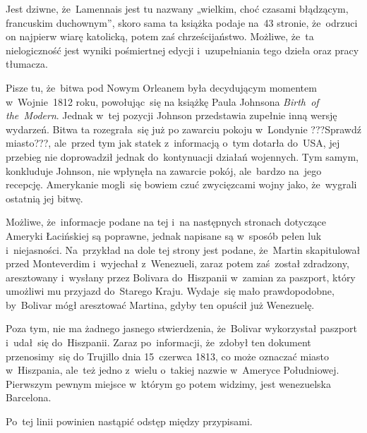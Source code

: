 \documentclass[a4paper,11pt]{article}
\numberwithin{equation}{section}
\begin{document}
\noindent
{} Jest dziwne, że~Lamennais jest tu nazwany „wielkim, choć czasami
błądzącym, francuskim duchownym”, skoro sama ta książka podaje na~43
stronie, że~odrzuci on najpierw wiarę katolicką, potem zaś chrześcijaństwo.
Możliwe, że~ta nielogiczność jest wyniki pośmiertnej edycji i~uzupełniania
tego dzieła oraz pracy tłumacza.

\VerSpaceFour





\noindent
{} Pisze tu, że~bitwa pod Nowym Orleanem była decydującym momentem
w~Wojnie~1812 roku, powołując~się na książkę Paula Johnsona
\textit{Birth~of the~Modern}. Jednak w~tej pozycji Johnson przedstawia
zupełnie inną wersję wydarzeń. Bitwa ta rozegrała~się już po zawarciu
pokoju w~Londynie ???Sprawdź miasto???, ale~przed tym jak statek
z~informacją o~tym dotarła do~USA, jej przebieg nie doprowadził jednak
do~kontynuacji działań wojennych. Tym samym, konkluduje Johnson, nie
wpłynęła na zawarcie pokój, ale~bardzo na~jego recepcję. Amerykanie
mogli~się bowiem czuć zwycięzcami wojny jako, że~wygrali ostatnią jej
bitwę.

\VerSpaceFour





\noindent
{} Możliwe, że~informacje podane na tej i~na następnych stronach
dotyczące Ameryki Łacińskiej są poprawne, jednak napisane są w~sposób pełen
luk i~niejasności. Na~przykład na dole tej strony jest podane, że~Martin
skapitulował przed Monteverdim i~wyjechał z~Wenezueli, zaraz potem
zaś~został zdradzony, aresztowany i~wysłany przez Bolivara do~Hiszpanii
w~zamian za paszport, który umożliwi mu przyjazd do~Starego Kraju.
Wydaje~się mało prawdopodobne, by~Bolivar mógł aresztować Martina, gdyby
ten opuścił już Wenezuelę.

Poza tym, nie ma żadnego jasnego stwierdzenia, że~Bolivar wykorzystał
paszport i~udał~się do~Hiszpanii. Zaraz po~informacji, że~zdobył ten
dokument przenosimy~się do Trujillo dnia 15~czerwca 1813, co może
oznaczać miasto w~Hiszpania, ale~też jedno z~wielu o~takiej nazwie
w~Ameryce Południowej. Pierwszym pewnym miejsce w~którym go potem
widzimy, jest wenezuelska Barcelona.

\VerSpaceFour





\noindent
{} Po~tej linii powinien nastąpić odstęp między
przypisami.

\VerSpaceFour
\end{document}
